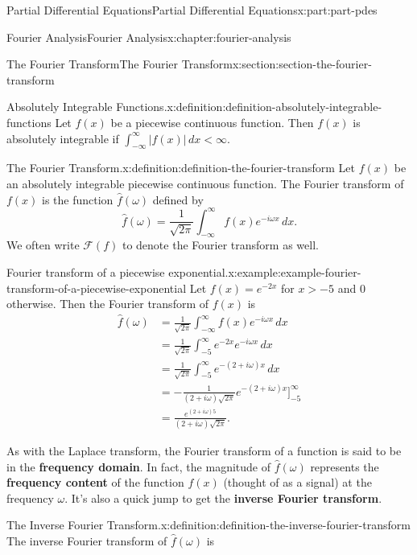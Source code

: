 \documentclass[twoside,10pt,]{book}
\newcommand{\terminology}[1]{\textbf{#1}}
\numberwithin{equation}{part}
\newcommand{\lt}{<}
\newcommand{\amp}{&}
\begin{document}
\begin{partptx}{Partial Differential Equations}{}{Partial Differential Equations}{}{}{x:part:part-pdes}
\begin{chapterptx}{Fourier Analysis}{}{Fourier Analysis}{}{}{x:chapter:fourier-analysis}
\begin{sectionptx}{The Fourier Transform}{}{The Fourier Transform}{}{}{x:section:section-the-fourier-transform}
\begin{definition}{Absolutely Integrable Functions.}{x:definition:definition-absolutely-integrable-functions}%
%
Let \(f(x)\) be a piecewise continuous function. Then \(f(x)\) is absolutely integrable if \(\int_{-\infty}^{\infty}|f(x)|\,dx \lt \infty.\)%
\end{definition}
\begin{definition}{The Fourier Transform.}{x:definition:definition-the-fourier-transform}%
%
Let \(f(x)\) be an absolutely integrable piecewise continuous function. The Fourier transform of \(f(x)\) is the function \(\hat{f}(\omega)\) defined by%
\begin{equation*}
\hat{f}(\omega) = \frac{1}{\sqrt{2\pi}}\int_{-\infty}^{\infty}f(x)e^{-i\omega x}\,dx.
\end{equation*}
We often write \(\mathcal{F}(f)\) to denote the Fourier transform as well.%
\end{definition}
\begin{example}{Fourier transform of a piecewise exponential.}{x:example:example-fourier-transform-of-a-piecewise-exponential}%
Let \(f(x) = e^{-2x}\) for \(x>-5\) and \(0\) otherwise. Then the Fourier transform of \(f(x)\) is%
\begin{align*}
\hat{f}(\omega) \amp = \frac{1}{\sqrt{2\pi}}\int_{-\infty}^{\infty}f(x)e^{-i\omega x}\,dx \\
\amp = \frac{1}{\sqrt{2\pi}}\int_{-5}^{\infty}e^{-2x}e^{-i\omega x}\,dx \\
\amp = \frac{1}{\sqrt{2\pi}}\int_{-5}^{\infty}e^{-(2+i\omega)x}\,dx \\
\amp = -\frac{1}{(2+i\omega)\sqrt{2\pi}}e^{-(2+i\omega)x}\Big]_{-5}^{\infty}\\
\amp = \frac{e^{(2+i\omega)5}}{(2+i\omega)\sqrt{2\pi}}. 
\end{align*}
%
\end{example}
As with the Laplace transform, the Fourier transform of a function is said to be in the \terminology{frequency domain}. In fact, the magnitude of \(\hat{f}(\omega)\) represents the \terminology{frequency content} of the function \(f(x)\) (thought of as a signal) at the frequency \(\omega\). It's also a quick jump to get the \terminology{inverse Fourier transform}.%
\begin{definition}{The Inverse Fourier Transform.}{x:definition:definition-the-inverse-fourier-transform}%
%
The inverse Fourier transform of \(\hat{f}(\omega)\) is%

\end{definition}
\end{sectionptx}
\end{chapterptx}
\end{partptx}
\end{document}
